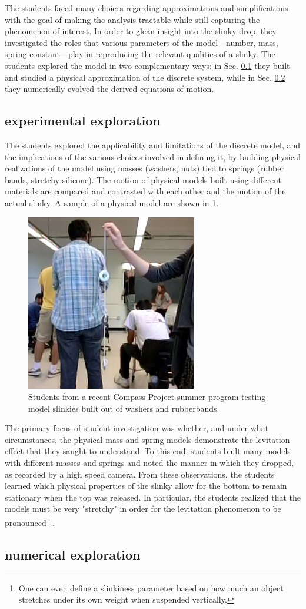 \documentclass[pre,preprint,superscriptaddress,longbibliography]{revtex4-1}
\newcommand{\FIGstudents}{
\begin{figure}[t]\center
\includegraphics[width=\columnwidth]{./img/students_small.jpg}
\caption{\label{fig:students} Students from a recent Compass Project summer program testing model slinkies built out of washers and rubberbands.}
\end{figure}
}
\begin{document}
The students faced many choices regarding approximations and simplifications with the goal of making the analysis tractable while still capturing the phenomenon of interest. %
In order to glean insight into the slinky drop, they investigated the roles that various parameters of the model---number, mass, spring constant---play in reproducing the relevant qualities of a slinky.  The students explored the model in two complementary ways: in Sec. \ref{sec:discrete:exp} they built and studied a physical approximation of the discrete system, while in Sec. \ref{sec:discrete:num} they numerically evolved the derived equations of motion.

\subsection{experimental exploration}
\label{sec:discrete:exp}
The students explored the applicability and limitations of the discrete model, and the implications of the various choices involved in defining it, by building physical realizations of the model using masses (washers, nuts) tied to springs (rubber bands, stretchy silicone). The motion of physical models built using different materials are compared and contrasted with each other and the motion of the actual slinky. A sample of a physical model are shown in \ref{fig:students}.  
\FIGstudents
The primary focus of student investigation was whether, and under what circumstances, the physical mass and spring models demonstrate the levitation effect that they saught to understand.  To this end, students built many models with different masses and springs and noted the manner in which they dropped, as recorded by a high speed camera. From these observations, the students learned which physical properties of the slinky allow for the bottom to remain stationary when the top was released.  In particular, the students realized that the models must be very "stretchy" in order for the levitation phenomenon to be pronounced \footnote{One can even define a slinkiness parameter based on how much an object stretches under its own weight when suspended vertically.}.

\subsection{numerical exploration}
\label{sec:discrete:num}
\end{document}
